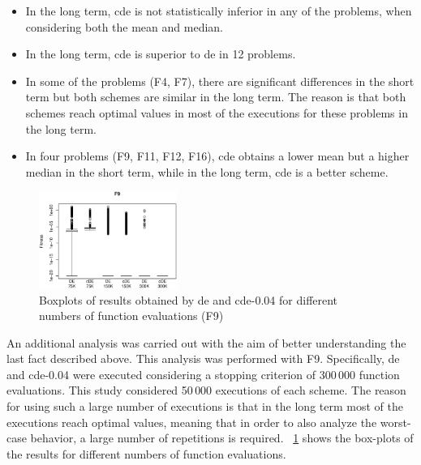 \documentclass[review,3p]{elsarticle}
\newcommand{\CDE}{c{\sc de}}
\newcommand{\DE}{{\sc de}}
\begin{document}
\begin{itemize}
	\item In the long term, \CDE{} is not statistically inferior in any of the problems, when considering both the mean and median.
	\item In the long term, \CDE{} is superior to \DE{} in 12 problems.
	\item In some of the problems (F4, F7), there are significant differences
       in the short term but both schemes are similar in the long term. The reason is that
       both schemes reach optimal values in most of the executions for these problems in the long term.
	\item In four problems (F9, F11, F12, F16), \CDE{} obtains a lower mean but a higher median
     in the short term, while in the long term, \CDE{} is a better scheme.
\end{itemize}

\begin{figure}[t]
\centering
	\includegraphics[width=0.40\textwidth]{images/cde004_vs_de_boxplots/F9.eps}
\caption{Boxplots of results obtained by \DE{} and \CDE{}-0.04 for different numbers of function evaluations (F9)}
\label{fig:boxplot_cde004_vs_de_f9}
\end{figure}



An additional analysis was carried out with the aim of better understanding the last fact described above.
%
This analysis was performed with F9.
%
Specifically, \DE{} and \CDE{}-0.04 were executed considering a stopping criterion of 300$\,$000 function evaluations.
%
This study considered 50$\,$000 executions of each scheme.
%
The reason for using such a large number of executions is that in the long term most of
the executions reach optimal values, meaning that in order to also analyze the worst-case behavior,
a large number of repetitions is required.
%
\figurename~\ref{fig:boxplot_cde004_vs_de_f9} shows the box-plots of the results for different numbers of function evaluations.
\end{document}
